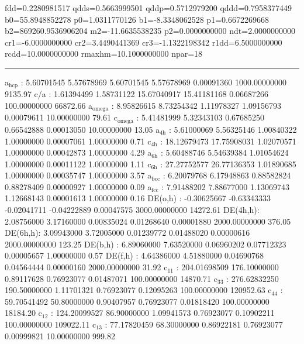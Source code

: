 \documentclass[11pt]{article}
\begin{document}
fdd=0.2280981517 qdds=0.5663999501 qddp=0.5712979200 qddd=0.7958377449 b0=55.8948852278 p0=1.0311770126 b1=-8.3348062528 p1=0.6672269668 b2=869260.9536906204 m2=-11.6635538235 p2=0.0000000000 ndt=2.0000000000 cr1=-6.0000000000 cr2=3.4490441369 cr3=-1.1322198342 r1dd=6.5000000000 rcdd=10.0000000000 rmaxhm=10.1000000000 npar=18 

\noindent\rule{\textwidth}{0.5pt}
a\(_{\text{hcp}}\)   :   5.60701545   5.57678969   5.60701545   5.57678969   0.00091360 1000.00000000      9135.97
c/a     :   1.61394499   1.58731122  15.67040917  15.41181168   0.06687266 100.00000000     66872.66
a\(_{\text{omega}}\) :   8.95826615   8.73254342   1.11978327   1.09156793   0.00079611  10.00000000        79.61
c\(_{\text{omega}}\) :   5.41481999   5.32343103   0.67685250   0.66542888   0.00013050  10.00000000        13.05
a\(_{\text{4h}}\)    :   5.61000069   5.56325146   1.00840322   1.00000000   0.00007061   1.00000000         0.71
c\(_{\text{4h}}\)    :  18.12679473  17.75908031   1.02070571   1.00000000   0.00042873   1.00000000         4.29
a\(_{\text{6h}}\)    :   5.60488746   5.54639384   1.01054624   1.00000000   0.00011122   1.00000000         1.11
c\(_{\text{6h}}\)    :  27.27752577  26.77136353   1.01890685   1.00000000   0.00035747   1.00000000         3.57
a\(_{\text{bcc}}\)   :   6.20079768   6.17948863   0.88582824   0.88278409   0.00000927   1.00000000         0.09
a\(_{\text{fcc}}\)   :   7.91488202   7.88677000   1.13069743   1.12668143   0.00001613   1.00000000         0.16
DE(o,h) :  -0.30625667  -0.63343333  -0.02041711  -0.04222889   0.00047575 3000.00000000     14272.61
DE(4h,h):   2.08756000   3.17160000   0.00835024   0.01268640   0.00001880 2000.00000000       376.05
DE(6h,h):   3.09943000   3.72005000   0.01239772   0.01488020   0.00000616 2000.00000000       123.25
DE(b,h) :   6.89060000   7.63520000   0.06960202   0.07712323   0.00005657   1.00000000         0.57
DE(f,h) :   4.64386000   4.51880000   0.04690768   0.04564444   0.00000160 2000.00000000        31.92
c\(_{\text{11}}\)    : 204.01698509 176.10000000   0.89117628   0.76923077   0.01487071 100.00000000     14870.71
c\(_{\text{33}}\)    : 276.62832250 190.50000000   1.11701321   0.76923077   0.12095263 100.00000000    120952.63
c\(_{\text{44}}\)    :  59.70541492  50.80000000   0.90407957   0.76923077   0.01818420 100.00000000     18184.20
c\(_{\text{12}}\)    : 124.20099527  86.90000000   1.09941573   0.76923077   0.10902211 100.00000000    109022.11
c\(_{\text{13}}\)    :  77.17820459  68.30000000   0.86922181   0.76923077   0.00999821  10.00000000       999.82
\end{document}
